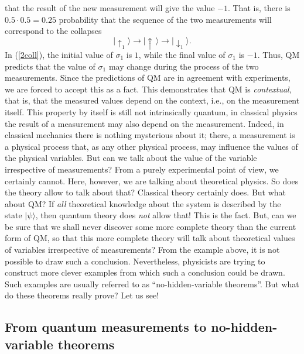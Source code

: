 \documentclass[12pt]{article}
\begin{document}
that the result of the new measurement will give the value $-1$.
That is, there is $0.5\cdot 0.5=0.25$ probability that the sequence of the two 
measurements will correspond to the collapses
\begin{equation}\label{2coll}
|\!\uparrow_1\rangle \rightarrow |\!\uparrow\,\rangle \rightarrow
|\!\downarrow_1\rangle .
\end{equation}
In (\ref{2coll}), the initial value of $\sigma_1$ is $1$, while the 
final value of $\sigma_1$ is $-1$. Thus, QM predicts that the value of 
$\sigma_1$ may change during the process of the two measurements.
Since the predictions of QM are in agreement with experiments, 
we are forced to accept this as a fact. This demonstrates that 
QM is {\em contextual}, that is, that the measured values depend on the 
context, i.e., on the measurement itself. This property 
by itself is still not intrinsically quantum, in classical physics 
the result of a measurement may also depend on the measurement.
Indeed, in classical mechanics there is nothing mysterious about it;
there, a measurement is a physical process that, as any other physical 
process, may influence the values of the physical variables. But 
can we talk about the value of the variable irrespective of 
measurements? From a purely experimental point of view, we certainly cannot.
Here, however, we are talking about theoretical physics. 
So does the theory allow to talk about that? Classical theory 
certainly does. But what about QM? If {\em all} theoretical knowledge 
about the system is described by the state $|\psi\rangle$, 
then quantum theory does {\em not} allow that! This is the fact. 
But, can we be sure that we shall never discover some more complete theory 
than the current form of QM, so that this more complete theory 
will talk about theoretical values of variables irrespective of 
measurements? From the example above, it is not possible to
draw such a conclusion. Nevertheless, physicists are trying 
to construct more clever examples from which such a conclusion 
could be drawn. Such examples are usually referred to as 
``no-hidden-variable theorems''. But what do these theorems 
really prove? Let us see!     

\subsection{From quantum measurements to no-hidden-variable 
theorems}
\end{document}
